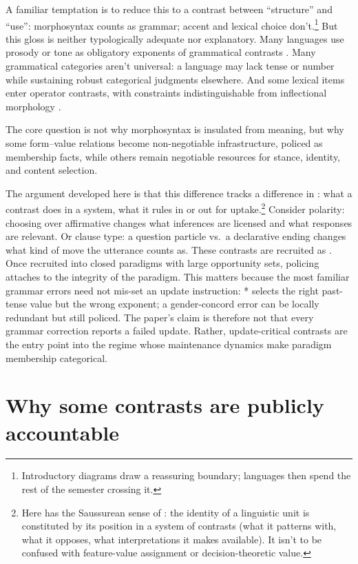 \documentclass[12pt,letterpaper]{article}
\begin{document}
A familiar temptation is to reduce this to a contrast between \enquote{structure} and \enquote{use}: morphosyntax counts as grammar; accent and lexical choice don't.\footnote{Introductory diagrams draw a reassuring boundary; languages then spend the rest of the semester crossing it.} But this gloss is neither typologically adequate nor explanatory. Many languages use prosody or tone as obligatory exponents of grammatical contrasts \citep{hyman2011,ladd2008}. Many grammatical categories aren't universal: a language may lack tense \citep{comrie1985} or number \citep{corbett2000} while sustaining robust categorical judgments elsewhere. And some lexical items enter operator contrasts, with constraints indistinguishable from inflectional morphology \citep{hoppertraugott2003,bybee2010}.

The core question is not why morphosyntax is insulated from meaning, but why some form--value relations become non-negotiable infrastructure, policed as membership facts, while others remain negotiable resources for stance, identity, and content selection.

The argument developed here is that this difference tracks a difference in : what a contrast does in a system, what it rules in or out for uptake.\footnote{Here  has the Saussurean sense of  \citep{saussure1916}: the identity of a linguistic unit is constituted by its position in a system of contrasts (what it patterns with, what it opposes, what interpretations it makes available). It isn't to be confused with feature-value assignment or decision-theoretic value.} Consider polarity: choosing  over affirmative changes what inferences are licensed and what responses are relevant. Or clause type: a question particle vs.\ a declarative ending changes what kind of move the utterance counts as. These contrasts are recruited as . Once recruited into closed paradigms with large opportunity sets, policing attaches to the integrity of the paradigm. This matters because the most familiar grammar errors need not mis-set an update instruction: * selects the right past-tense value but the wrong exponent; a gender-concord error can be locally redundant but still policed. The paper's claim is therefore not that every grammar correction reports a failed update. Rather, update-critical contrasts are the entry point into the regime whose maintenance dynamics make paradigm membership categorical.

\section{Why some contrasts are publicly accountable}
\end{document}
